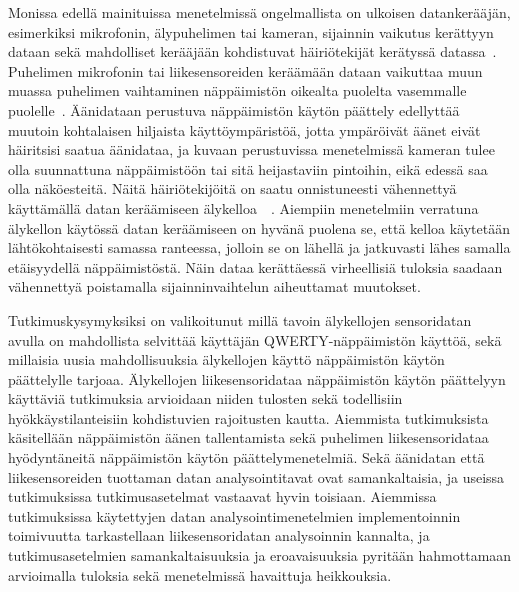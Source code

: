 \documentclass[finnish]{tktltiki2}
\theoremstyle{definition}
\theoremstyle{remark}
\begin{document}
Monissa edellä mainituissa menetelmissä ongelmallista on ulkoisen datankerääjän, esimerkiksi mikrofonin, älypuhelimen tai kameran, sijainnin vaikutus kerättyyn dataan sekä mahdolliset kerääjään kohdistuvat häiriötekijät kerätyssä datassa~\cite{berger}. Puhelimen mikrofonin tai liikesensoreiden keräämään dataan vaikuttaa muun muassa puhelimen vaihtaminen näppäimistön oikealta puolelta vasemmalle puolelle~\cite{mar}. Äänidataan perustuva näppäimistön käytön päättely edellyttää muutoin kohtalaisen hiljaista käyttöympäristöä, jotta ympäröivät äänet eivät häiritsisi saatua äänidataa, ja kuvaan perustuvissa menetelmissä kameran tulee olla suunnattuna näppäimistöön tai sitä heijastaviin pintoihin, eikä edessä saa olla näköesteitä. Näitä häiriötekijöitä on saatu onnistuneesti vähennettyä käyttämällä datan keräämiseen älykelloa~\cite{liu}~\cite{maiti}. Aiempiin menetelmiin verratuna älykellon käytössä datan keräämiseen on hyvänä puolena se, että kelloa käytetään lähtökohtaisesti samassa ranteessa, jolloin se on lähellä ja jatkuvasti lähes samalla etäisyydellä näppäimistöstä. Näin dataa kerättäessä virheellisiä tuloksia saadaan vähennettyä poistamalla sijainninvaihtelun aiheuttamat muutokset. 

Tutkimuskysymyksiksi on valikoitunut millä tavoin älykellojen sensoridatan avulla on mahdollista selvittää käyttäjän QWERTY-näppäimistön käyttöä, sekä millaisia uusia mahdollisuuksia älykellojen käyttö näppäimistön käytön päättelylle tarjoaa. Älykellojen liikesensoridataa näppäimistön käytön päättelyyn käyttäviä tutkimuksia arvioidaan niiden tulosten sekä todellisiin hyökkäystilanteisiin kohdistuvien rajoitusten kautta. Aiemmista tutkimuksista käsitellään näppäimistön äänen tallentamista sekä puhelimen liikesensoridataa hyödyntäneitä näppäimistön käytön päättelymenetelmiä. Sekä äänidatan että liikesensoreiden tuottaman datan analysointitavat ovat samankaltaisia, ja useissa tutkimuksissa tutkimusasetelmat vastaavat hyvin toisiaan. Aiemmissa tutkimuksissa käytettyjen datan analysointimenetelmien implementoinnin toimivuutta tarkastellaan liikesensoridatan analysoinnin kannalta, ja tutkimusasetelmien samankaltaisuuksia ja eroavaisuuksia pyritään hahmottamaan arvioimalla tuloksia sekä menetelmissä havaittuja heikkouksia.


\pagebreak
\end{document}
